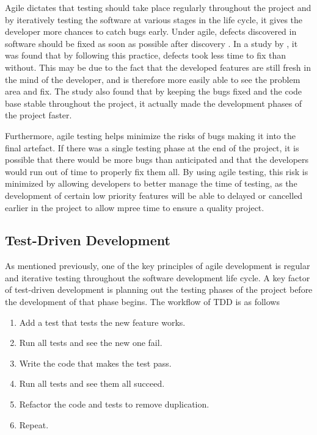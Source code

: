 Agile dictates that testing should take place regularly throughout the project and by iteratively testing the software at various stages in the life cycle, it gives the developer more chances to catch bugs early.
Under agile, defects discovered in software should be fixed as soon as possible after discovery \citep{beck2001agile}.
In a study by \cite{talby2006}, it was found that by following this practice, defects took less time to fix than without.
This may be due to the fact that the developed features are still fresh in the mind of the developer, and is therefore more easily able to see the problem area and fix.
The study also found that by keeping the bugs fixed and the code base stable throughout the project, it actually made the development phases of the project faster.

Furthermore, agile testing helps minimize the risks of bugs making it into the final artefact. 
If there was a single testing phase at the end of the project, it is possible that there would be more bugs than anticipated and that the developers would run out of time to properly fix them all. 
By using agile testing, this risk is minimized by allowing developers to better manage the time of testing, as the development of certain low priority features will be able to delayed or cancelled earlier in the project to allow mpree time to ensure a quality project.

\subsection{Test-Driven Development}
As mentioned previously, one of the key principles of agile development is regular and iterative testing throughout the software development life cycle.
A key factor of test-driven development is planning out the testing phases of the project before the development of that phase begins.
The workflow of TDD is as follows \citep{Beck:2002:TDD:579193}
\begin{enumerate}
	\item Add a test that tests the new feature works.
	\item Run all tests and see the new one fail.
	\item Write the code that makes the test pass.
	\item Run all tests and see them all succeed.
	\item Refactor the code and tests to remove duplication.
	\item Repeat.
\end{enumerate}

